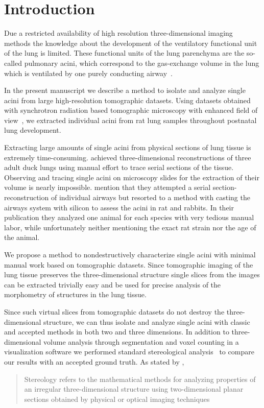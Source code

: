 \documentclass[twoside,paper=a4,abstract=true,english,DIVcalc]{scrartcl}
\begin{document}
\clearpage
\section{Introduction}
Due a restricted availability of high resolution three-dimensional imaging methods the knowledge about the development of the ventilatory functional unit of the lung is limited. These functional units of the lung parenchyma are the so-called pulmonary acini, which correspond to the gas-exchange volume in the lung which is ventilated by one purely conducting airway~\cite{Rodriguez1987}.

In the present manuscript we describe a method to isolate and analyze single acini from large high-resolution tomographic datasets. Using datasets obtained with synchrotron radiation based tomographic microscopy with enhanced field of view~\cite{Haberthuer2010a}, we extracted individual acini from rat lung samples throughout postnatal lung development. 

Extracting large amounts of single acini from physical sections of lung tissue is extremely time-consuming. \citet{Woodward2005} achieved three-dimensional reconstructions of three adult duck lungs using manual effort to trace serial sections of the tissue. Observing and tracing single acini on microscopy slides for the extraction of their volume is nearly impossible. \citet{Rodriguez1987} mention that they attempted a serial section-reconstruction of individual airways but resorted to a method with casting the airways system with silicon to assess the acini in rat and rabbits. In their publication they analyzed one animal for each species with very tedious manual labor, while unfortunately neither mentioning the exact rat strain nor the age of the animal.

We propose a method to nondestructively characterize single acini with minimal manual work based on tomographic datasets. Since tomographic imaging of the lung tissue preserves the three-dimensional structure single slices from the images can be extracted trivially easy and be used for precise analysis of the morphometry of structures in the lung tissue.

Since such virtual slices from tomographic datasets do not destroy the three-dimensional structure, we can thus isolate and analyze single acini with classic and accepted methods in both two and three dimensions. In addition to three-dimensional volume analysis through segmentation and voxel counting in a visualization software we performed standard stereological analysis~\cite{Hsia2010} to compare our results with an accepted ground truth. As stated by \citet{Hsia2010}, \blockquote{Stereology refers to the mathematical methods for analyzing properties of an irregular three-dimensional structure using two-dimensional planar sections obtained by physical or optical imaging techniques}.
\end{document}
